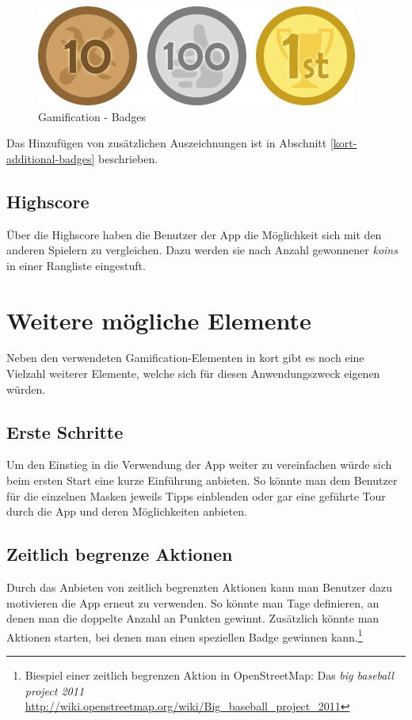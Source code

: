 \begin{figure}[H]
	\centering
	\includegraphics[scale=0.7]{images/gamification/gamification-badges}
	\caption{Gamification - Badges}
	\label{gamification-badges}
\end{figure}

Das Hinzufügen von zusätzlichen Auszeichnungen ist in Abschnitt \ref{kort-additional-badges} beschrieben.

\subsection{Highscore}
Über die Highscore haben die Benutzer der App die Möglichkeit sich mit den anderen Spielern zu vergleichen. Dazu werden sie nach Anzahl gewonnener \emph{koins} in einer Rangliste eingestuft.

\section{Weitere mögliche Elemente}
Neben den verwendeten Gamification-Elementen in kort gibt es noch eine Vielzahl weiterer Elemente, welche sich für diesen Anwendungszweck eigenen würden.

\subsection{Erste Schritte}
Um den Einstieg in die Verwendung der App weiter zu vereinfachen würde sich beim ersten Start eine kurze Einführung anbieten. So könnte man dem Benutzer für die einzelnen Masken jeweils Tipps einblenden oder gar eine geführte Tour durch die App und deren Möglichkeiten anbieten.

\subsection{Zeitlich begrenze Aktionen}
Durch das Anbieten von zeitlich begrenzten Aktionen kann man Benutzer dazu motivieren die App erneut zu verwenden.
So könnte man Tage definieren, an denen man die doppelte Anzahl an Punkten gewinnt.
Zusätzlich könnte man Aktionen starten, bei denen man einen speziellen Badge gewinnen kann.\footnote{Biespiel einer zeitlich begrenzen Aktion in OpenStreetMap: Das \emph{big baseball project 2011} \url{http://wiki.openstreetmap.org/wiki/Big_baseball_project_2011}}

